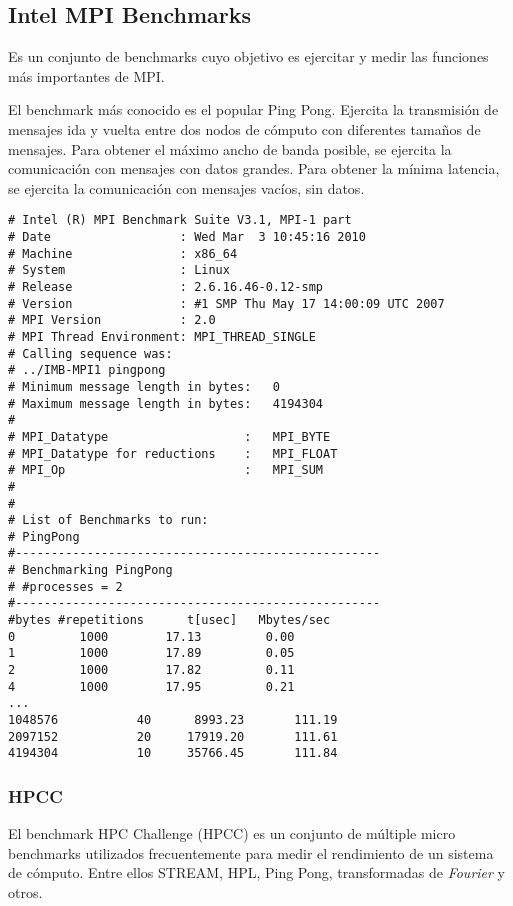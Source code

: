 \documentclass[a4paper]{report}
\begin{document}
\subsection{Intel MPI Benchmarks}

Es un conjunto de benchmarks cuyo objetivo es ejercitar y medir las funciones m\'as importantes de MPI.

El benchmark m\'as conocido es el popular Ping Pong. Ejercita la transmisi\'on de mensajes ida y vuelta entre dos
nodos de c\'omputo con diferentes tama\~nos de mensajes.
Para obtener el m\'aximo ancho de banda posible, se ejercita la comunicaci\'on con mensajes con datos grandes.
Para obtener la m\'inima latencia, se ejercita la comunicaci\'on con mensajes vac\'ios, sin datos.

\begin{verbatim}
# Intel (R) MPI Benchmark Suite V3.1, MPI-1 part
# Date                  : Wed Mar  3 10:45:16 2010
# Machine               : x86_64
# System                : Linux
# Release               : 2.6.16.46-0.12-smp
# Version               : #1 SMP Thu May 17 14:00:09 UTC 2007
# MPI Version           : 2.0
# MPI Thread Environment: MPI_THREAD_SINGLE
# Calling sequence was:
# ../IMB-MPI1 pingpong
# Minimum message length in bytes:   0
# Maximum message length in bytes:   4194304
#
# MPI_Datatype                   :   MPI_BYTE
# MPI_Datatype for reductions    :   MPI_FLOAT
# MPI_Op                         :   MPI_SUM
#
#
# List of Benchmarks to run:
# PingPong
#---------------------------------------------------
# Benchmarking PingPong
# #processes = 2
#---------------------------------------------------
#bytes #repetitions      t[usec]   Mbytes/sec
0         1000        17.13         0.00
1         1000        17.89         0.05
2         1000        17.82         0.11
4         1000        17.95         0.21
...
1048576           40      8993.23       111.19
2097152           20     17919.20       111.61
4194304           10     35766.45       111.84
\end{verbatim}

\subsubsection{HPCC}

El benchmark HPC Challenge (HPCC) es un conjunto de m\'ultiple micro benchmarks utilizados frecuentemente para medir
el rendimiento de un sistema de c\'omputo. Entre ellos STREAM, HPL, Ping Pong, transformadas de {\it Fourier} y
otros.
\end{document}
